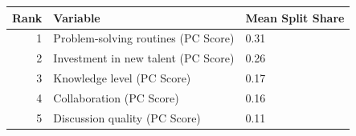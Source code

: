 
\begin{tabular}{rll}
\toprule
Rank & Variable & Mean Split Share\\
\midrule
1 & Problem-solving routines (PC Score) & 0.31\\
2 & Investment in new talent (PC Score) & 0.26\\
3 & Knowledge level (PC Score) & 0.17\\
4 & Collaboration (PC Score) & 0.16\\
5 & Discussion quality (PC Score) & 0.11\\
\bottomrule
\end{tabular}
